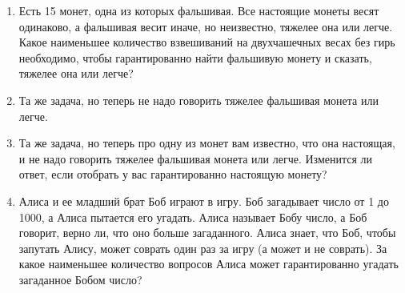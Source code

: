 \documentclass{article}
\begin{document}
\begin{enumerate}[label*=\protect\fbox{\arabic{enumi}}]
\item Есть 15 монет, одна из которых фальшивая. Все настоящие монеты весят одинаково, а фальшивая весит иначе, но неизвестно, тяжелее она или легче. Какое наименьшее количество взвешиваний на двухчашечных весах без гирь необходимо, чтобы гарантированно найти фальшивую монету и сказать, тяжелее она или легче?

\item Та же задача, но теперь не надо говорить тяжелее фальшивая монета или легче.

\item Та же задача, но теперь про одну из монет вам известно, что она настоящая, и не надо говорить тяжелее фальшивая монета или легче. Изменится ли ответ, если отобрать у вас гарантированно настоящую монету?

\item Алиса и ее младший брат Боб играют в игру. Боб загадывает число от 1 до 1000, а Алиса пытается его угадать. Алиса называет Бобу число, а Боб говорит, верно ли, что оно больше загаданного. Алиса знает, что Боб, чтобы запутать Алису, может соврать один раз за игру (а может и не соврать). За какое наименьшее количество вопросов Алиса может гарантированно угадать загаданное Бобом число?

\end{enumerate}
\end{document}
